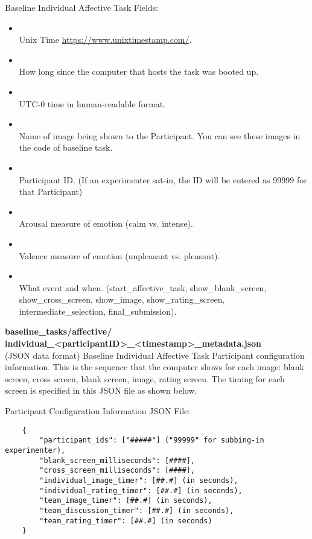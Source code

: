 \begin{description}
Baseline Individual Affective Task Fields:
\begin{itemize}
    \item {}\\Unix Time \href{https://www.unixtimestamp.com/}{https://www.unixtimestamp.com/}.
    \item {}\\How long since the computer that hosts the task was booted up.
    \item {}\\ UTC-0 time in human-readable format.
    \item {}\\Name of image being shown to the Participant. You can see these images in the code of baseline task.
    \item {}\\Participant ID. (If an experimenter sat-in, the ID will be entered as 99999 for that Participant)
    \item {}\\Arousal measure of emotion (calm vs. intense).
    \item {}\\Valence measure of emotion (unpleasant vs. pleasant).
    \item {}\\What event and when. (start\_affective\_task, show\_blank\_screen, show\_cross\_screen, show\_image, show\_rating\_screen, intermediate\_selection, final\_submission).
\end{itemize}


\medskip
\item\textbf{baseline\_tasks/affective/\\individual\_<participantID>\_<timestamp>\_metadata.json}\\(JSON data format)
Baseline Individual Affective Task Participant configuration information. This is the sequence that the computer shows for each image: blank screen, cross screen, blank screen, image, rating screen. The timing for each screen is specified in this JSON file as shown below.

Participant Configuration Information JSON File:
\begin{verbatim}
    {
        "participant_ids": ["#####"] ("99999" for subbing-in experimenter),
        "blank_screen_milliseconds": [####],
        "cross_screen_milliseconds": [####],
        "individual_image_timer": [##.#] (in seconds),
        "individual_rating_timer": [##.#] (in seconds),
        "team_image_timer": [##.#] (in seconds),
        "team_discussion_timer": [##.#] (in seconds),
        "team_rating_timer": [##.#] (in seconds)
    }
\end{verbatim}



\end{description}

